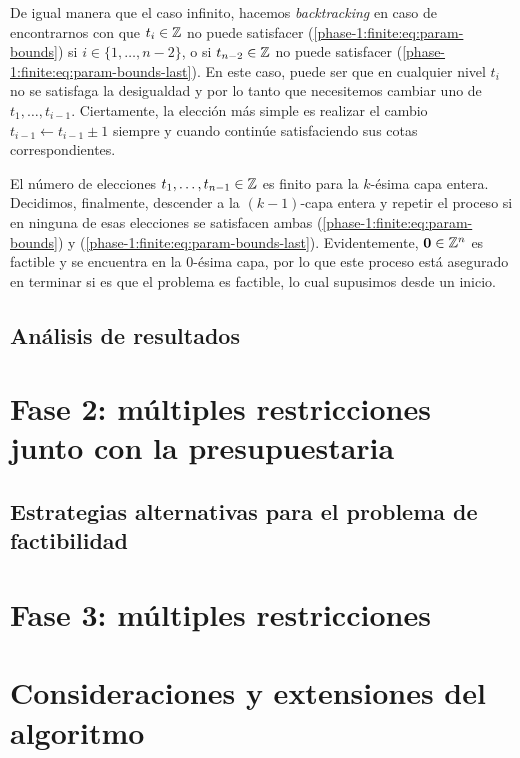 De igual manera que el caso infinito, hacemos \textit{backtracking} en caso de encontrarnos con que
$t_i \in \mathbb{Z}$ no puede satisfacer (\ref{phase-1:finite:eq:param-bounds}) si $i \in \lbrace 1, \ldots,
n - 2\rbrace$, o si $t_{n - 2} \in \mathbb{Z}$ no puede satisfacer
(\ref{phase-1:finite:eq:param-bounds-last}). En este caso, puede ser que en cualquier nivel $t_i$ no
se satisfaga la desigualdad y por lo tanto que necesitemos cambiar uno de $t_1, \ldots, t_{i -
1}$. Ciertamente, la elección más simple es realizar el cambio $t_{i - 1} \leftarrow t_{i - 1} \pm
1$ siempre y cuando continúe satisfaciendo sus cotas correspondientes.

El número de elecciones $t_1, \ldots, t_{n - 1} \in \mathbb{Z}$ es finito para la $k$-ésima capa entera.
Decidimos, finalmente, descender a la $(k - 1)$-capa entera y repetir el proceso si en ninguna de esas
elecciones se satisfacen ambas (\ref{phase-1:finite:eq:param-bounds}) y
(\ref{phase-1:finite:eq:param-bounds-last}). Evidentemente, $\boldsymbol{0} \in \mathbb{Z}^n$ es factible y se
encuentra en la 0-ésima capa, por lo que este proceso está asegurado en terminar si es que el
problema es factible, lo cual supusimos desde un inicio.

\subsection{Análisis de resultados}

\section{Fase 2: múltiples restricciones junto con la presupuestaria}
\subsection{Estrategias alternativas para el problema de factibilidad}
\section{Fase 3: múltiples restricciones}
\section{Consideraciones y extensiones del algoritmo}
